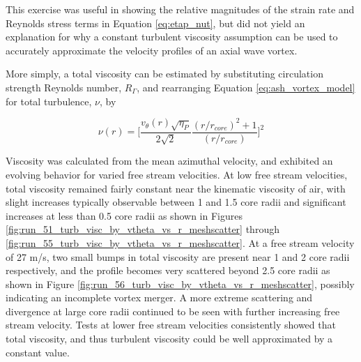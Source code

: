 \vspace{32pt}


This exercise was useful in showing the relative magnitudes of the strain rate 
and Reynolds stress terms in Equation \ref{eq:etap_nut}, but did not yield an 
explanation for why a constant turbulent viscosity assumption can be used to 
accurately approximate the velocity profiles of an axial wave vortex.

More simply, a total viscosity can be estimated by 
substituting circulation strength Reynolds number, $R_\Gamma$, and rearranging 
Equation \ref{eq:ash_vortex_model} for total turbulence, $\nu$, by

\begin{equation}
\nu(r) = \Bigg[\frac{v_\theta(r) \sqrt{\eta_P}}{2 \sqrt{2}}
\frac{(r/r_{core})^2 + 1}{(r/r_{core})}\Bigg]^2
\label{eq:total_visc}
\end{equation}

Viscosity was calculated from the mean azimuthal velocity, and exhibited an 
evolving behavior for varied free stream velocities. At low free stream 
velocities, total viscosity remained fairly constant near the kinematic 
viscosity of air, with slight increases typically observable between 1 and 1.5 
core radii and significant increases at less than 0.5 core radii as shown in 
Figures 
\ref{fig:run_51_turb_visc_by_vtheta_vs_r_meshscatter} through 
\ref{fig:run_55_turb_visc_by_vtheta_vs_r_meshscatter}. At a free stream 
velocity of 27 m/s, two small bumps in total viscosity are present near 1 and 2 
core radii respectively, and the profile becomes very scattered beyond 2.5 core 
radii as shown in Figure \ref{fig:run_56_turb_visc_by_vtheta_vs_r_meshscatter}, 
possibly indicating an incomplete vortex merger. A more extreme scattering and 
divergence at large core radii continued to be seen with further increasing 
free stream velocity. Tests at lower free stream velocities consistently showed 
that total viscosity, and thus turbulent viscosity could be well approximated 
by a constant value. 

\vspace{32pt}











